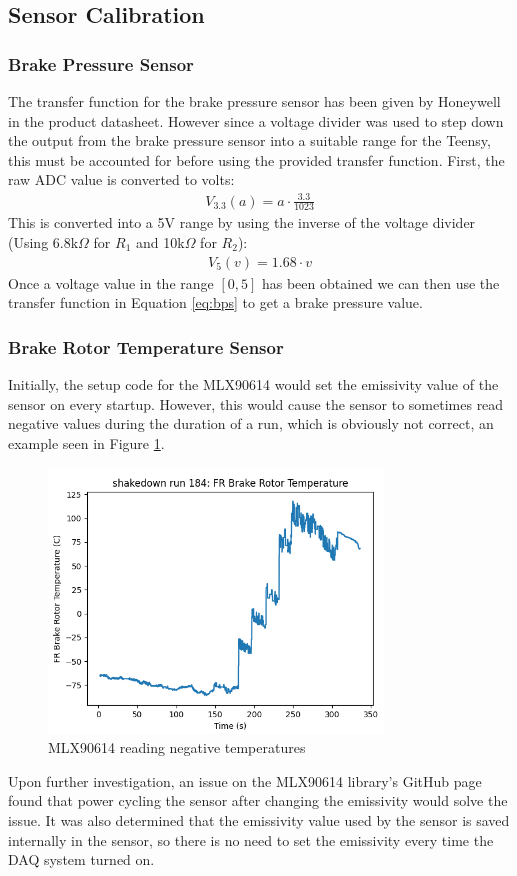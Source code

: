 \subsection{Sensor Calibration}
\subsubsection{Brake Pressure Sensor}
The transfer function for the brake pressure sensor has been given by Honeywell in the product datasheet.
However since a voltage divider was used to step down the output from the brake pressure sensor into a suitable range for the Teensy, this must be accounted for before using the provided transfer function.
First, the raw ADC value is converted to volts:
\begin{gather}
    V_{3.3}(a) = a\cdot \frac{3.3}{1023}
\end{gather}
This is converted into a 5V range by using the inverse of the voltage divider (Using 6.8k$\Omega$ for $R_1$ and 10k$\Omega$ for $R_2$):
\begin{gather}
    V_5(v) = 1.68\cdot v
\end{gather}
Once a voltage value in the range $[0,5]$ has been obtained we can then use the transfer function in Equation \ref{eq:bps} to get a brake pressure value.

\subsubsection{Brake Rotor Temperature Sensor}
Initially, the setup code for the MLX90614 would set the emissivity value of the sensor on every startup.
However, this would cause the sensor to sometimes read negative values during the duration of a run, which is obviously not correct, an example seen in Figure \ref{fig:hehehehehe}.
\begin{figure}[H]
    \centering
    \includegraphics[width=3.5in]{images/negativetemp.png}
    \caption{MLX90614 reading negative temperatures}
    \label{fig:hehehehehe}
\end{figure}
Upon further investigation, an issue on the MLX90614 library's GitHub page found that power cycling the sensor after changing the emissivity would solve the issue.
It was also determined that the emissivity value used by the sensor is saved internally in the sensor, so there is no need to set the emissivity every time the DAQ system turned on.
\vspace{1em}

